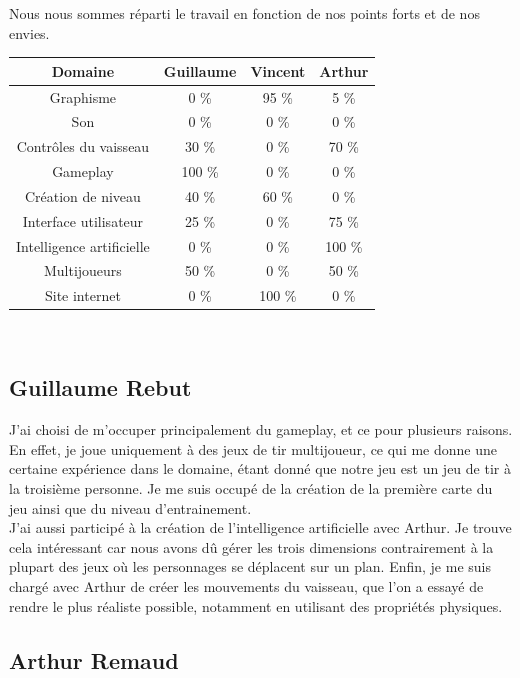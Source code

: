 \documentclass[12pt, titlepage]{article}
\begin{document}
\begin{spacing}{1.5}
Nous nous sommes réparti le travail en fonction de nos points forts et de nos envies.\\

\begin{center}
\begin{tabular}{|c|c|c|c|}
\hline
Domaine & Guillaume & Vincent & Arthur\\
\hline
Graphisme & 0 \% & 95 \% & 5 \%\\
\hline
Son & 0 \% & 0 \% & 0 \% \\
\hline
Contrôles du vaisseau & 30 \% & 0 \% & 70  \%\\
\hline
Gameplay & 100 \% & 0 \% & 0 \%\\
\hline
Création de niveau & 40 \% & 60 \% & 0 \%\\
\hline
Interface utilisateur & 25 \% & 0 \% & 75 \%\\
\hline
Intelligence artificielle & 0 \% & 0 \% & 100 \%\\
\hline
Multijoueurs & 50 \% & 0 \% & 50 \%\\
\hline
Site internet & 0 \% & 100 \% & 0 \%\\
\hline
\end{tabular}\\
\end{center}

\subsection{Guillaume Rebut}

J'ai choisi de m'occuper principalement du gameplay, et ce pour plusieurs raisons. En effet, je joue uniquement à des jeux de tir multijoueur, ce qui me donne une certaine expérience dans le domaine, étant donné que notre jeu est un jeu de tir à la troisième personne. Je me suis occupé de la création de la première carte du jeu ainsi que du niveau d'entrainement.\\

J'ai aussi participé à la création de l'intelligence artificielle avec Arthur. Je trouve cela intéressant car nous avons dû gérer les trois dimensions contrairement à la plupart des jeux où les personnages se déplacent sur un plan. Enfin, je me suis chargé avec Arthur de créer les mouvements du vaisseau, que l'on a essayé de rendre le plus réaliste possible, notamment en utilisant des propriétés physiques.\\

\subsection{Arthur Remaud}


\end{spacing}
\end{document}
